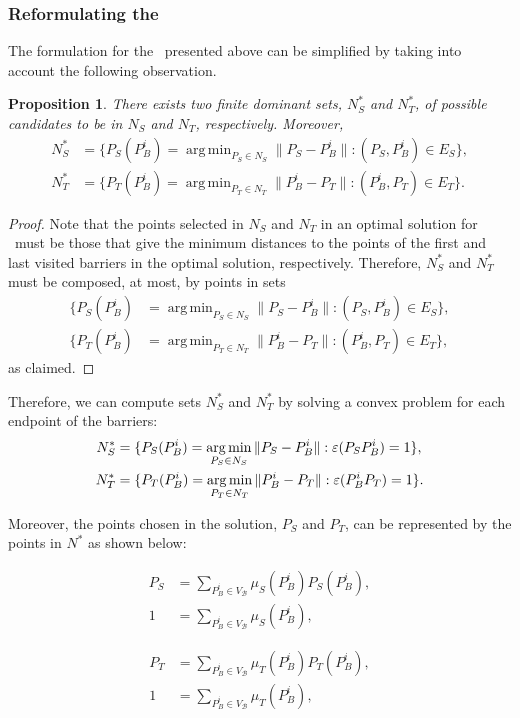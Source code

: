 \documentclass[a4paper]{elsarticle}
\DeclareMathOperator*{\argmin}{arg\,min}
\newcommand{\SPPN}{{\sf{H-SPPN}\xspace }}
\newtheorem{prop}{Proposition}
\begin{document}
	\subsubsection{Reformulating the \SPPN}\label{section:reformulation}
	The formulation for the \SPPN \ presented above can be simplified by taking into account the following observation.
	\begin{prop}
		There exists two finite dominant sets, $N_S^*$ and $N_T^*$, of possible candidates to be in  $N_S$ and $N_T$, respectively. Moreover,
		\begin{align*}
			N_S^*&=\{P_S(P_B^i)=\argmin_{P_S\in N_S} \|P_S - P_B^i\|:(P_S, P_B^i)\in E_S\},\\
			N_T^*&=\{P_T(P_B^i)=\argmin_{P_T\in N_T} \|P_B^i - P_T\|:(P_B^i, P_T)\in E_T\}.
		\end{align*}
	\end{prop}
	\begin{proof}
		Note that the points selected in $N_S$ and $N_T$ in an optimal solution for \SPPN \ must be those that give the minimum distances to the points of the first and last visited barriers in the optimal solution, respectively. Therefore, $N_S^*$ and $N_T^*$ must be composed, at most, by points in sets
		\begin{align*}
			\{P_S(P_B^i)&=\argmin_{P_S\in N_S} \|P_S - P_B^i\|:(P_S, P_B^i)\in E_S\},\\
			\{P_T(P_B^i)&=\argmin_{P_T\in N_T} \|P_B^i - P_T\|:(P_B^i, P_T)\in E_T\},
		\end{align*} 
		as claimed.
	\end{proof}
	\noindent
	Therefore, we can compute sets $N_S^*$ and $N_T^*$ by solving a convex problem for each endpoint of the barriers:
	\begin{align*}
		N_S^*&=\{P_S(P_B^i)=\argmin_{P_S\in N_S} \|P_S - P_B^i\|:\varepsilonvar{P_S}{P_B^i}=1\},\\
		N_T^*&=\{P_T(P_B^i)=\argmin_{P_T\in N_T} \|P_B^i - P_T\|:\varepsilonvar{P_B^i}{P_T}=1\}.
	\end{align*}

	
	Moreover, the points chosen in the solution, $P_S$ and $P_T$, can be represented by the points in $N^*$ as shown below:
	
	\begin{minipage}{.5\linewidth}
	\begin{align*}\tag{N$_S^*$-C}\label{eq:nCs}
		P_S&=\sum_{P_B^i\in V_{\mathcal B}}\mu_S(P_B^i)P_S(P_B^i),\\
		1&=\sum_{P_B^i\in V_{\mathcal B}}\mu_S(P_B^i),
	\end{align*}
	\end{minipage}
	\begin{minipage}{.5\linewidth}
	\begin{align*}\tag{N$_T^*$-C}\label{eq:nCt}
		P_T&=\sum_{P_B^i\in V_{\mathcal B}}\mu_T(P_B^i)P_T(P_B^i),\\
		1&=\sum_{P_B^i\in V_{\mathcal B}}\mu_T(P_B^i),
	\end{align*}
	\end{minipage}
\end{document}
